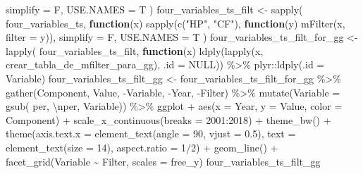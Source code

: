 \documentclass[10pt,landscape,a3paper]{article}
\newenvironment{Shaded}{\begin{snugshade}}{\end{snugshade}}
\newcommand{\AttributeTok}[1]{\textcolor[rgb]{0.77,0.63,0.00}{#1}}
\newcommand{\ConstantTok}[1]{\textcolor[rgb]{0.00,0.00,0.00}{#1}}
\newcommand{\ControlFlowTok}[1]{\textcolor[rgb]{0.13,0.29,0.53}{\textbf{#1}}}
\newcommand{\DecValTok}[1]{\textcolor[rgb]{0.00,0.00,0.81}{#1}}
\newcommand{\FloatTok}[1]{\textcolor[rgb]{0.00,0.00,0.81}{#1}}
\newcommand{\FunctionTok}[1]{\textcolor[rgb]{0.00,0.00,0.00}{#1}}
\newcommand{\NormalTok}[1]{#1}
\newcommand{\OtherTok}[1]{\textcolor[rgb]{0.56,0.35,0.01}{#1}}
\newcommand{\SpecialCharTok}[1]{\textcolor[rgb]{0.00,0.00,0.00}{#1}}
\newcommand{\StringTok}[1]{\textcolor[rgb]{0.31,0.60,0.02}{#1}}
\begin{document}
\begin{Shaded}
\begin{Highlighting}[]
  \AttributeTok{simplify =}\NormalTok{ F, }\AttributeTok{USE.NAMES =}\NormalTok{ T}
\NormalTok{  )}
\NormalTok{four\_variables\_ts\_filt }\OtherTok{\textless{}{-}} \FunctionTok{sapply}\NormalTok{(}
\NormalTok{  four\_variables\_ts,}
  \ControlFlowTok{function}\NormalTok{(x) }\FunctionTok{sapply}\NormalTok{(}\FunctionTok{c}\NormalTok{(}\StringTok{"HP"}\NormalTok{, }\StringTok{"CF"}\NormalTok{), }\ControlFlowTok{function}\NormalTok{(y) }\FunctionTok{mFilter}\NormalTok{(x, }\AttributeTok{filter =}\NormalTok{ y)),}
  \AttributeTok{simplify =}\NormalTok{ F, }\AttributeTok{USE.NAMES =}\NormalTok{ T}
\NormalTok{)}
\NormalTok{four\_variables\_ts\_filt\_for\_gg }\OtherTok{\textless{}{-}} \FunctionTok{lapply}\NormalTok{(}
\NormalTok{  four\_variables\_ts\_filt, }\ControlFlowTok{function}\NormalTok{(x) }\FunctionTok{ldply}\NormalTok{(}\FunctionTok{lapply}\NormalTok{(x, crear\_tabla\_de\_mfilter\_para\_gg), }\AttributeTok{.id =} \ConstantTok{NULL}\NormalTok{)) }\SpecialCharTok{\%\textgreater{}\%}
\NormalTok{  plyr}\SpecialCharTok{::}\FunctionTok{ldply}\NormalTok{(}\AttributeTok{.id =} \StringTok{\textquotesingle{}Variable\textquotesingle{}}\NormalTok{)}
\NormalTok{four\_variables\_ts\_filt\_gg }\OtherTok{\textless{}{-}}\NormalTok{ four\_variables\_ts\_filt\_for\_gg }\SpecialCharTok{\%\textgreater{}\%}
  \FunctionTok{gather}\NormalTok{(Component, Value, }\SpecialCharTok{{-}}\NormalTok{Variable, }\SpecialCharTok{{-}}\NormalTok{Year, }\SpecialCharTok{{-}}\NormalTok{Filter) }\SpecialCharTok{\%\textgreater{}\%} 
  \FunctionTok{mutate}\NormalTok{(}\AttributeTok{Variable =} \FunctionTok{gsub}\NormalTok{(}\StringTok{\textquotesingle{} per\textquotesingle{}}\NormalTok{, }\StringTok{\textquotesingle{}}\SpecialCharTok{\textbackslash{}n}\StringTok{per\textquotesingle{}}\NormalTok{, Variable)) }\SpecialCharTok{\%\textgreater{}\%} 
\NormalTok{  ggplot }\SpecialCharTok{+}
  \FunctionTok{aes}\NormalTok{(}\AttributeTok{x =}\NormalTok{ Year, }\AttributeTok{y =}\NormalTok{ Value, }\AttributeTok{color =}\NormalTok{ Component) }\SpecialCharTok{+}
    \FunctionTok{scale\_x\_continuous}\NormalTok{(}\AttributeTok{breaks =} \DecValTok{2001}\SpecialCharTok{:}\DecValTok{2018}\NormalTok{) }\SpecialCharTok{+} 
  \FunctionTok{theme\_bw}\NormalTok{() }\SpecialCharTok{+}
  \FunctionTok{theme}\NormalTok{(}\AttributeTok{axis.text.x =} \FunctionTok{element\_text}\NormalTok{(}\AttributeTok{angle =} \DecValTok{90}\NormalTok{, }\AttributeTok{vjust =} \FloatTok{0.5}\NormalTok{), }\AttributeTok{text =} \FunctionTok{element\_text}\NormalTok{(}\AttributeTok{size =} \DecValTok{14}\NormalTok{), }\AttributeTok{aspect.ratio =} \DecValTok{1}\SpecialCharTok{/}\DecValTok{2}\NormalTok{) }\SpecialCharTok{+}
  \FunctionTok{geom\_line}\NormalTok{() }\SpecialCharTok{+}
  \FunctionTok{facet\_grid}\NormalTok{(Variable }\SpecialCharTok{\textasciitilde{}}\NormalTok{ Filter, }\AttributeTok{scales =} \StringTok{\textquotesingle{}free\_y\textquotesingle{}}\NormalTok{)}
\NormalTok{four\_variables\_ts\_filt\_gg}
\end{Highlighting}
\end{Shaded}
\end{document}
